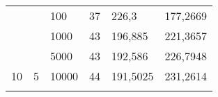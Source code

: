 \documentclass{article}
\begin{document}
\begin{table}[h]
\begin{tabular}{llllll}
		&                                                                       &                                                                           &                                                                              &                                                                                     &                                                                                       \\ \hline
		\multicolumn{1}{|l|}{}                                                 & \multicolumn{1}{l|}{}                                                 & \multicolumn{1}{l|}{100}                                                  & \multicolumn{1}{l|}{37}                                                      & \multicolumn{1}{l|}{226,3}                                                          & \multicolumn{1}{l|}{177,2669}                                                         \\ \cline{3-6} 
		\multicolumn{1}{|l|}{}                                                 & \multicolumn{1}{l|}{}                                                 & \multicolumn{1}{l|}{1000}                                                 & \multicolumn{1}{l|}{43}                                                      & \multicolumn{1}{l|}{196,885}                                                        & \multicolumn{1}{l|}{221,3657}                                                         \\ \cline{3-6} 
		\multicolumn{1}{|l|}{}                                                 & \multicolumn{1}{l|}{}                                                 & \multicolumn{1}{l|}{5000}                                                 & \multicolumn{1}{l|}{43}                                                      & \multicolumn{1}{l|}{192,586}                                                        & \multicolumn{1}{l|}{226,7948}                                                         \\ \cline{3-6} 
		\multicolumn{1}{|l|}{\multirow{-4}{*}{10}}                             & \multicolumn{1}{l|}{\multirow{-4}{*}{5}}                              & \multicolumn{1}{l|}{10000}                                                & \multicolumn{1}{l|}{44}                                                      & \multicolumn{1}{l|}{191,5025}                                                       & \multicolumn{1}{l|}{231,2614}                                                         \\ \hline
		&                                                                       &                                                                           &                                                                              &                                                                                     &                                                                                       \\ \hline

\end{tabular}
\end{table}
\end{document}

